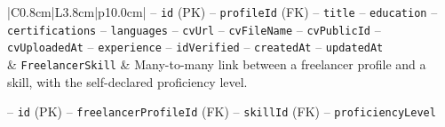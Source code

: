 \begin{center}
\begin{longtable}{|C{0.8cm}|L{3.8cm}|p{10.0cm}|}
\hspace*{1em}-- \texttt{id} (PK) \newline
\hspace*{1em}-- \texttt{profile\allowbreak Id} (FK) \newline
\hspace*{1em}-- \texttt{title} \newline
\hspace*{1em}-- \texttt{education} \newline
\hspace*{1em}-- \texttt{certifications} \newline
\hspace*{1em}-- \texttt{languages} \newline
\hspace*{1em}-- \texttt{cv\allowbreak Url} \newline
\hspace*{1em}-- \texttt{cv\allowbreak File\allowbreak Name} \newline
\hspace*{1em}-- \texttt{cv\allowbreak Public\allowbreak Id} \newline
\hspace*{1em}-- \texttt{cv\allowbreak Uploaded\allowbreak At} \newline
\hspace*{1em}-- \texttt{experience} \newline
\hspace*{1em}-- \texttt{id\allowbreak Verified} \newline
\hspace*{1em}-- \texttt{created\allowbreak At} \newline
\hspace*{1em}-- \texttt{updated\allowbreak At} \\
 & \texttt{Freelancer\allowbreak Skill} & Many-to-many link between a freelancer profile and a skill, with the self-declared proficiency level.\par\smallskip
\hspace*{1em}-- \texttt{id} (PK) \newline
\hspace*{1em}-- \texttt{freelancer\allowbreak Profile\allowbreak Id} (FK) \newline
\hspace*{1em}-- \texttt{skill\allowbreak Id} (FK) \newline
\hspace*{1em}-- \texttt{proficiency\allowbreak Level} \\

\end{longtable}
\end{center}
